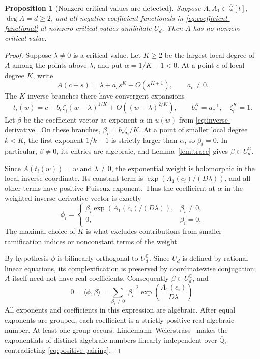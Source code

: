 \documentclass[11pt]{article}
\numberwithin{equation}{section}
\newtheorem{proposition}[theorem]{Proposition}
\theoremstyle{definition}\newtheorem{definition}[theorem]{Definition}
\theoremstyle{remark}\newtheorem{remark}[theorem]{Remark}
\newcommand{\C}{\mathbb C}
\newcommand{\Qb}{\overline{\mathbb Q}}
\newcommand{\UC}{U_d^{\C}}
\begin{document}
\begin{proposition}[Nonzero critical values are detected]\label{prop:arithmetic}
Suppose $A,A_1\in\Qb[t]$, $\deg A=d\ge2$, and all negative coefficient
functionals in \eqref{eq:coefficient-functional} at nonzero critical
values annihilate $U_d$. Then $A$ has no nonzero critical value.
\end{proposition}
\begin{proof}
Suppose $\lambda\ne0$ is a critical value. Let $K\ge2$ be the largest
local degree of $A$ among the points above $\lambda$, and put
$\alpha=1/K-1<0$. At a point $c$ of local degree $K$, write
\[
 A(c+s)=\lambda+a_cs^K+O(s^{K+1}),\qquad a_c\ne0.
\]
The $K$ inverse branches there have convergent expansions
\[
 t_i(w)=c+b_c\zeta_i(w-\lambda)^{1/K}
              +O((w-\lambda)^{2/K}),
 \qquad b_c^K=a_c^{-1},\quad \zeta_i^K=1.
\]
Let $\beta$ be the coefficient vector at exponent $\alpha$ in
$u(w)$ from \eqref{eq:inverse-derivative}. On these branches,
$\beta_i=b_c\zeta_i/K$. At a point of smaller local degree $k<K$,
the first exponent $1/k-1$ is strictly larger than $\alpha$, so
$\beta_i=0$. In particular, $\beta\ne0$, its entries are algebraic,
and Lemma~\ref{lem:trace} gives $\beta\in\UC$.

Since $A(t_i(w))=w$ and $\lambda\ne0$, the exponential weight is
holomorphic in the local inverse coordinate. Its constant term is
$\exp(A_1(c_i)/(D\lambda))$, and all other terms have positive
Puiseux exponent. Thus the coefficient at $\alpha$ in the weighted
inverse-derivative vector is exactly
\begin{equation}\label{eq:weighted-leading}
 \phi_i=\begin{cases}
 \beta_i\exp(A_1(c_i)/(D\lambda)),&\beta_i\ne0,\\
 0,&\beta_i=0.
 \end{cases}
\end{equation}
The maximal choice of $K$ is what excludes contributions from smaller
ramification indices or nonconstant terms of the weight.

By hypothesis $\phi$ is bilinearly orthogonal to $\UC$. Since $U_d$
is defined by rational linear equations, its complexification is
preserved by coordinatewise conjugation; $A$ itself need not have
real coefficients. Consequently $\overline\beta\in\UC$, and
\begin{equation}\label{eq:positive-pairing}
 0=\langle\phi,\overline\beta\rangle
  =\sum_{\beta_i\ne0}|\beta_i|^2
       \exp\!\left(\frac{A_1(c_i)}{D\lambda}\right).
\end{equation}
All exponents and coefficients in this expression are algebraic.
After equal exponents are grouped, each coefficient is a strictly
positive real algebraic number. At least one group occurs.
Lindemann--Weierstrass~\cite{Baker} makes the exponentials of distinct
algebraic numbers linearly independent over $\Qb$, contradicting
\eqref{eq:positive-pairing}.
\end{proof}
\end{document}
